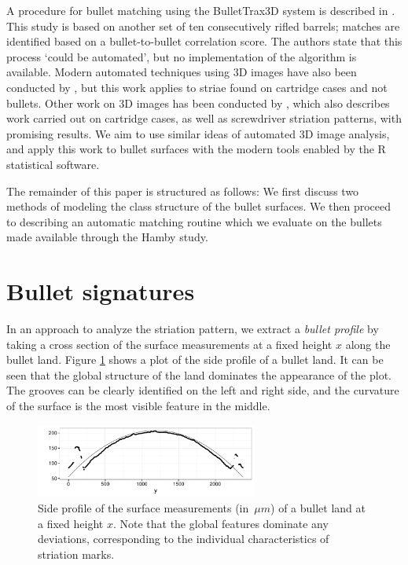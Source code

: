 \documentclass[aoas, preprint]{imsart}\usepackage[]{graphicx}\usepackage[]{color}
\newenvironment{knitrout}{}{} %
\begin{document}
A procedure for bullet matching using the BulletTrax3D system is described in \citet{roberge:2006}. This study is based on another set of ten consecutively rifled barrels; matches are identified based on a bullet-to-bullet correlation score. The authors state that this process `could be automated', but no implementation of the algorithm is available. Modern automated techniques using 3D images have also been conducted by \citet{riva:2014}, but this work applies to striae found on cartridge cases and not bullets. Other work on 3D images has been conducted by \citet{petraco:2012}, which also describes work carried out on cartridge cases, as well as screwdriver striation patterns, with promising results. We aim to use similar ideas of automated 3D image analysis, and apply this work to bullet surfaces with the modern tools enabled by the R statistical software.

The remainder of this paper is structured as follows: We first discuss two methods of modeling the class structure of the bullet surfaces. %
We then proceed to describing an automatic matching routine which we evaluate on the bullets made available through the Hamby study.

\section{Bullet signatures}

In an approach to analyze the striation pattern, we extract a \emph{bullet profile} \citep{ma:2004} by taking a cross section of the surface measurements at a fixed height $x$ along the bullet land.
Figure \ref{fig:fixedX} shows a plot of the side profile of a bullet land. It can be seen that the global structure of the land dominates the appearance of the plot. The grooves can be clearly identified on the left and right side, and the curvature of the surface is the most visible feature in the middle.

\begin{figure}[hbtp]
  \centering
\begin{knitrout}
\color{fgcolor}
\includegraphics[width=0.65\textwidth]{fixedX-1} 

\end{knitrout}
\caption{\label{fig:fixedX}Side profile of the surface measurements (in~$\mu m$) of a bullet land at a fixed height $x$. Note that the global features dominate any deviations, corresponding to the individual characteristics of striation marks.}
\end{figure}
\end{document}
